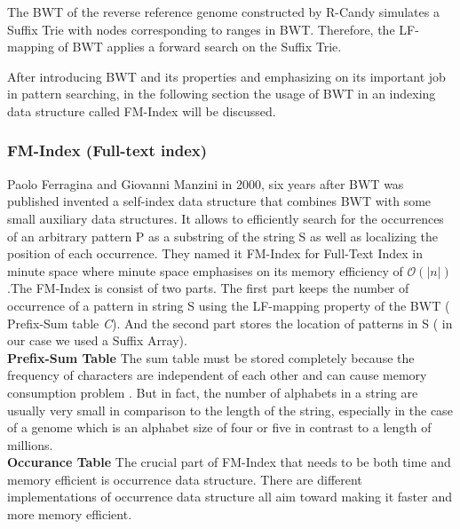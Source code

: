 \documentclass[11pt,a4paper]{report}
\begin{document}
The BWT of the reverse reference genome constructed by
R-Candy simulates a Suffix Trie with nodes corresponding to 
ranges in BWT.
Therefore, the LF-mapping of  BWT applies a forward 
search on the Suffix Trie.


After introducing BWT and its properties and 
emphasizing on its important job in pattern 
searching, in the following section the usage 
of BWT in an indexing data structure called 
FM-Index will be discussed\cite{fmindex}. 





\subsubsection{FM-Index (Full-text index)}  
\label{FM-Index (Full-text index)}

Paolo Ferragina and Giovanni Manzini in 2000, six years after BWT was 
published invented a self-index data structure that combines BWT with 
some small auxiliary data structures. It allows to efficiently search 
for the occurrences of an arbitrary pattern P as a substring of the 
string S as well as localizing the position of each occurrence. They 
named it FM-Index for Full-Text Index in minute space where minute 
space emphasises on its memory efficiency of $\mathcal{O}(\lvert n 
\rvert)$ .The FM-Index is consist of two parts. The first part keeps 
the number of occurrence of a pattern in string S using the LF-mapping 
property of the BWT ( Prefix-Sum table \emph{C}). And the second part 
stores the location of patterns in S ( in our case we used a Suffix 
Array)\cite{Wavthesis}.\\

\textbf{Prefix-Sum Table}  The sum table must be stored completely because
the frequency of characters are independent of each other and can cause 
memory consumption problem \cite{Wavthesis}. But in  fact, the number of 
alphabets in a string are usually very small in comparison to the length 
of the string, especially in the case of a genome which is an alphabet size 
of four or five in contrast to a length of millions.
\\

\textbf{Occurance Table} The crucial part of FM-Index that needs to be 
both time and memory efficient is occurrence data structure\cite{Wavthesis}.
There are different implementations of occurrence data structure all aim 
toward making it faster and more memory efficient.
\\
\end{document}
